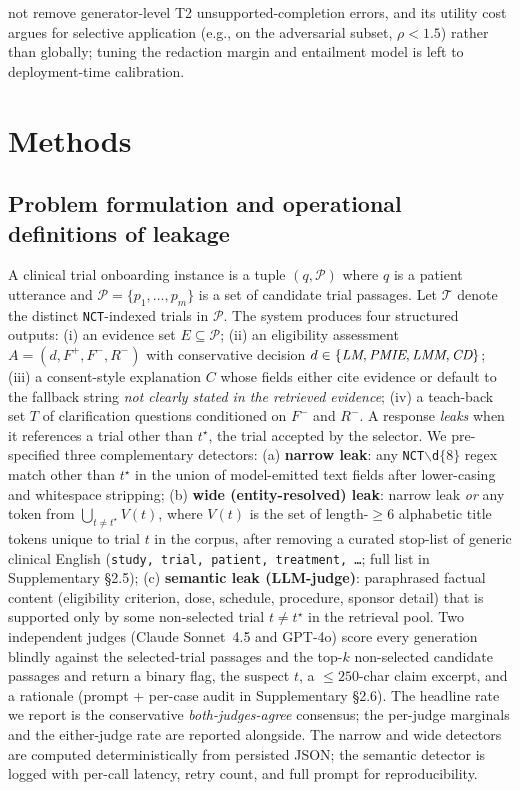 \documentclass[11pt]{article}
\newcommand{\fallback}{\textit{not clearly stated in the retrieved evidence}}
\begin{document}
not remove generator-level T2 unsupported-completion errors, and its utility cost argues for selective application (e.g., on the adversarial subset, $\rho<1.5$) rather than globally; tuning the redaction margin and entailment model is left to deployment-time calibration.

\section{Methods}
\label{sec:methods}

\subsection{Problem formulation and operational definitions of leakage}
\label{sec:methods_leak_def}
A clinical trial onboarding instance is a tuple $(q, \mathcal{P})$ where $q$ is a patient utterance and $\mathcal{P} = \{p_1, \ldots, p_m\}$ is a set of candidate trial passages. Let $\mathcal{T}$ denote the distinct \texttt{NCT}-indexed trials in $\mathcal{P}$. The system produces four structured outputs: (i) an evidence set $E \subseteq \mathcal{P}$; (ii) an eligibility assessment $A = (d, F^+, F^-, R^-)$ with conservative decision $d \in \{\emph{LM}, \emph{PMIE}, \emph{LMM}, \emph{CD}\}$; (iii) a consent-style explanation $C$ whose fields either cite evidence or default to the fallback string \fallback; (iv) a teach-back set $T$ of clarification questions conditioned on $F^-$ and $R^-$. A response \emph{leaks} when it references a trial other than $t^\star$, the trial accepted by the selector. We pre-specified three complementary detectors: (a) \textbf{narrow leak}: any \texttt{NCT$\backslash$d$\{8\}$} regex match other than $t^\star$ in the union of model-emitted text fields after lower-casing and whitespace stripping; (b) \textbf{wide (entity-resolved) leak}: narrow leak \emph{or} any token from $\bigcup_{t \neq t^\star} V(t)$, where $V(t)$ is the set of length-$\geq 6$ alphabetic title tokens unique to trial $t$ in the corpus, after removing a curated stop-list of generic clinical English (\texttt{study, trial, patient, treatment, \ldots}; full list in Supplementary \S2.5); (c) \textbf{semantic leak (LLM-judge)}: paraphrased factual content (eligibility criterion, dose, schedule, procedure, sponsor detail) that is supported only by some non-selected trial $t \neq t^\star$ in the retrieval pool. Two independent judges (Claude Sonnet~4.5 and GPT-4o) score every generation blindly against the selected-trial passages and the top-$k$ non-selected candidate passages and return a binary flag, the suspect $t$, a $\leq 250$-char claim excerpt, and a rationale (prompt + per-case audit in Supplementary \S2.6). The headline rate we report is the conservative \emph{both-judges-agree} consensus; the per-judge marginals and the either-judge rate are reported alongside. The narrow and wide detectors are computed deterministically from persisted JSON; the semantic detector is logged with per-call latency, retry count, and full prompt for reproducibility.
\end{document}
